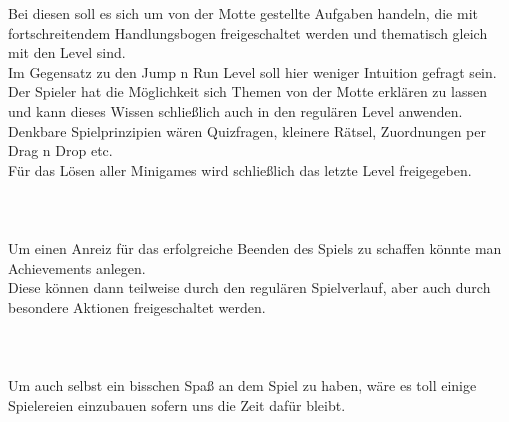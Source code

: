 \documentclass[10pt,a4paper,notitlepage]{report}
\begin{document}
	Bei diesen soll es sich um von der Motte gestellte Aufgaben handeln, die mit fortschreitendem Handlungsbogen freigeschaltet werden 
	und thematisch gleich mit den Level sind.\\
	Im Gegensatz zu den Jump n Run Level soll hier weniger Intuition gefragt sein. Der Spieler hat die Möglichkeit sich Themen von der Motte 
	erklären zu lassen und kann dieses Wissen schließlich auch in den regulären Level anwenden.\\
	Denkbare Spielprinzipien wären Quizfragen, kleinere Rätsel, Zuordnungen per Drag n Drop etc.\\
	Für das Lösen aller Minigames wird schließlich das letzte Level freigegeben.\\
	\\
	\
	\\\\
	\Text
		Um einen Anreiz für das erfolgreiche Beenden des Spiels zu schaffen könnte man Achievements anlegen.\\
	Diese können dann teilweise durch den regulären Spielverlauf, aber auch durch besondere Aktionen freigeschaltet werden.\\
	\\
	\\\\
	\Text
		Um auch selbst ein bisschen Spaß an dem Spiel zu haben, wäre es toll einige Spielereien einzubauen sofern uns die Zeit dafür bleibt.\\
	\\
	\Fusszeile
\end{document}
